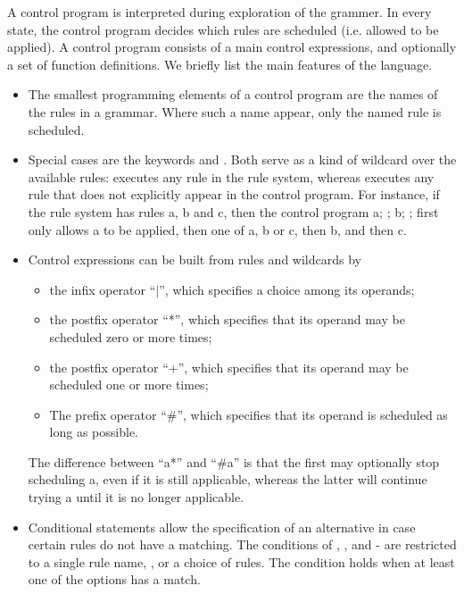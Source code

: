 A control program is interpreted during exploration of the grammer. In every
state, the control program decides which rules are scheduled (i.e. allowed to
be applied). A control program consists of a main control expressions, and
optionally a set of function definitions. We briefly list the main features of
the language.
%
\begin{itemize}
\item The smallest programming elements of a control program are the names of
  the rules in a grammar. Where such a name appear, only the named rule is scheduled.

\item Special cases are the keywords \anyK{} and \otherK. Both
  serve as a kind of wildcard over the available rules: \anyK{} executes
  any rule in the rule system, whereas \otherK{} executes any rule that
  does not explicitly appear in the control program. For instance, if the rule
  system has rules \textsf{a}, \textsf{b} and \textsf{c}, then the control
  program \textsf{a; \anyK; b; \otherK;} first only allows
  \textsf{a} to be applied, then one of \textsf{a}, \textsf{b} or \textsf{c},
  then \textsf{b}, and then \textsf{c}.

\item Control expressions can be built from rules and wildcards by 
\begin{itemize}\noitemsep
\item the infix operator ``\textsf{$|$}'', which specifies a choice among its
  operands;
\item the postfix operator ``\textsf{*}'', which specifies that its operand may
  be scheduled zero or more times;
\item the postfix operator ``\textsf{+}'', which specifies that its operand may
  be scheduled one or more times;
\item The prefix operator ``\textsf{\#}'', which specifies that its operand is
  scheduled as long as possible. 
\end{itemize}
The difference between ``\textsf{a*}'' and ``\textsf{\#a}'' is that the first
may optionally stop scheduling \textsf{a}, even if it is still applicable,
whereas the latter will continue trying \textsf{a} until it is no longer applicable.

\item Conditional statements allow the specification of an alternative in case
  certain rules do not have a matching. The conditions of \ifK,
  \whileK, \untilK{} and \doK-\whileK{} are restricted to a
  single rule name, \trueK, or a choice of rules. The condition holds
  when at least one of the options has a match.


\end{itemize}
